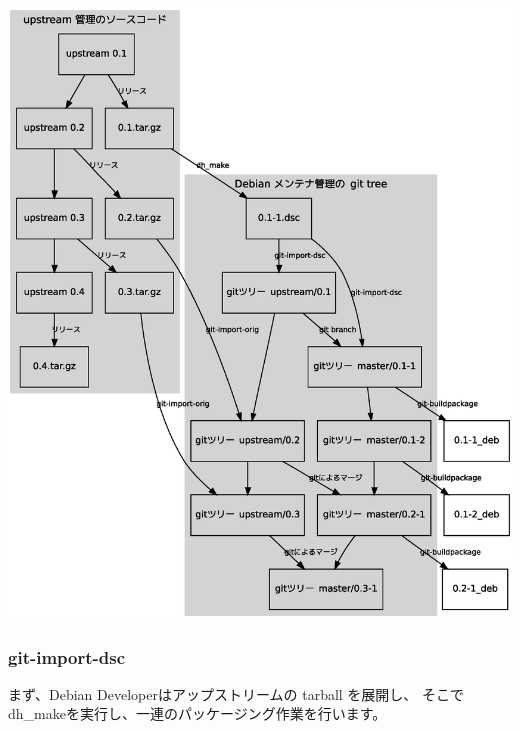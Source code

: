 \documentclass[mingoth,a4paper]{jsarticle}
\begin{document}
\includegraphics[width=1\hsize]{image200704/git-buildpackage.eps}

\subsubsection{git-import-dsc}

まず、Debian Developerはアップストリームの tarball を展開し、
そこで dh\_{}makeを実行し、一連のパッケージング作業を行います。
\end{document}
